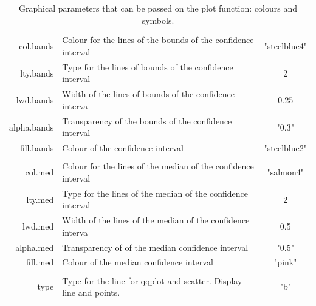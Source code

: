 \documentclass{report}
\begin{document}
\begin{table}[!h]
\begin{center}
\begin{tabular}{| r p{8cm} c|}
{\ttfamily col.bands} &  Colour for the lines of the bounds of the confidence interval & "steelblue4"  \\
{\ttfamily lty.bands} &  Type for the lines of bounds
of the confidence interval & 2  \\
{\ttfamily lwd.bands} &  Width of the lines of bounds
of the confidence interva & 0.25  \\
{\ttfamily alpha.bands} &  Transparency of the bounds of the confidence interval & "0.3"  \\
{\ttfamily fill.bands} &  Colour of the confidence interval & "steelblue2"  \\
{\ttfamily } & &  \\
{\ttfamily col.med} &  Colour for the lines of the median of the confidence interval & "salmon4"  \\
{\ttfamily lty.med} &  Type for the lines of the median
of the confidence interval & 2  \\
{\ttfamily lwd.med} &  Width of the lines of the median
of the confidence interva & 0.5  \\
{\ttfamily alpha.med} &  Transparency of of the median confidence interval & "0.5"  \\
{\ttfamily fill.med} &  Colour of the median confidence  interval & "pink"  \\
{\ttfamily } & &  \\

{\ttfamily type } &  Type for the line for qqplot and scatter. Display line and points. & "b"  \\
\hline
\end{tabular} 
\end{center}
\caption{Graphical parameters that can be passed on the plot function: colours and symbols.} \label{tab:graphicalOptions2}
\end{table} 

\clearpage
\end{document}
